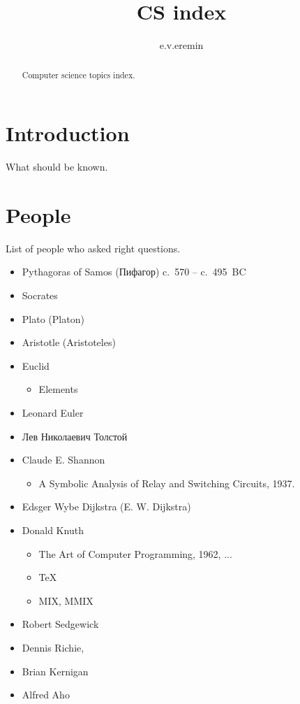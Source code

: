 \documentclass[12pt,a4paper]{article}
\begin{document}
\title{CS index}
\author{e.v.eremin}

\maketitle

\begin{abstract}
Computer science topics index.
\end{abstract}

\section{Introduction}

What should be known.

\section{People}

List of people who asked right questions.

\begin{itemize}
\item Pythagoras of Samos (Пифагор) c.~570 – c.~495~BC
\item Socrates
\item Plato (Platon)
\item Aristotle (Aristoteles)
\item Euclid
	\begin{itemize}
	\item Elements
	\end{itemize}
\item Leonard Euler
\item Лев Николаевич Толстой
\item Claude E. Shannon
	\begin{itemize}
	\item A Symbolic Analysis of Relay and Switching Circuits, 1937.
	\end{itemize}
\item Edsger Wybe Dijkstra (E. W. Dijkstra)
\item Donald Knuth
	\begin{itemize}
	\item The Art of Computer Programming, 1962, ...
	\item \TeX
	\item MIX, MMIX
	\end{itemize}
\item Robert Sedgewick
\item Dennis Richie,
\item Brian Kernigan
\item Alfred Aho
\end{itemize}
\end{document}
